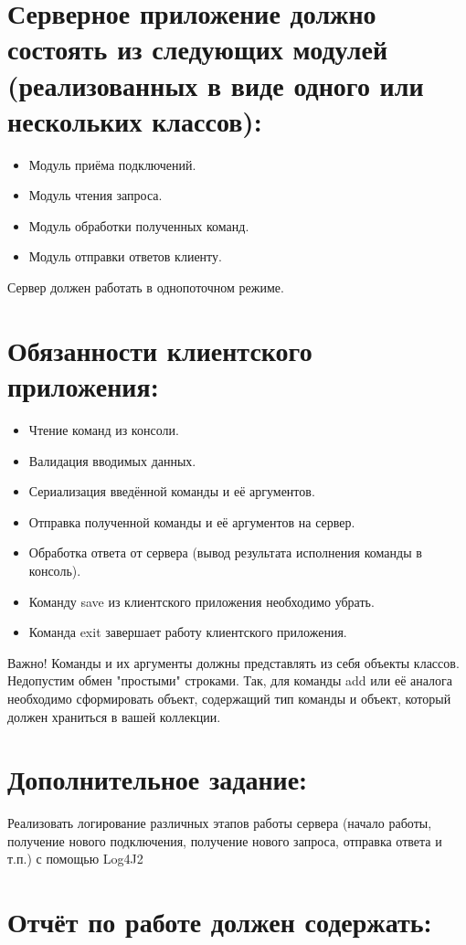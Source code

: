 \documentclass{article}
\begin{document}
\section*{Серверное приложение должно состоять из следующих модулей (реализованных в виде одного или нескольких классов):}
\begin{itemize}
  \item Модуль приёма подключений.
  \item Модуль чтения запроса.
  \item Модуль обработки полученных команд.
  \item Модуль отправки ответов клиенту.
\end{itemize}

Сервер должен работать в однопоточном режиме.

\section*{Обязанности клиентского приложения:}
\begin{itemize}
  \item Чтение команд из консоли.
  \item Валидация вводимых данных.
  \item Сериализация введённой команды и её аргументов.
  \item Отправка полученной команды и её аргументов на сервер.
  \item Обработка ответа от сервера (вывод результата исполнения команды в консоль).
  \item Команду save из клиентского приложения необходимо убрать.
  \item Команда exit завершает работу клиентского приложения.
\end{itemize}

Важно! Команды и их аргументы должны представлять из себя объекты классов. Недопустим обмен "простыми" строками. Так, для команды add или её аналога необходимо сформировать объект, содержащий тип команды и объект, который должен храниться в вашей коллекции.

\section*{Дополнительное задание:}
Реализовать логирование различных этапов работы сервера (начало работы, получение нового подключения, получение нового запроса, отправка ответа и т.п.) с помощью Log4J2

\section*{Отчёт по работе должен содержать:}
\end{document}
